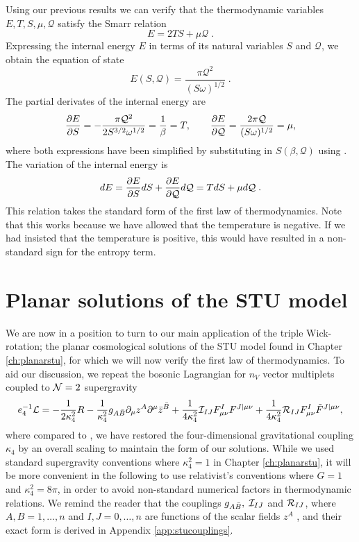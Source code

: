 Using our previous results we can verify that the thermodynamic variables $E,T,S,\mu, \mathcal{Q}$ satisfy the Smarr relation
\begin{equation}
E = 2TS + \mu \mathcal{Q}  \;.
\end{equation}
Expressing the internal energy $E$ in terms of its natural variables $S$ and $\mathcal{Q}$, we obtain the equation of state
\begin{equation*}
    E(S,\mathcal{Q}) = \frac{\pi \mathcal{Q}^2 }{(S \omega)^{1/2}} \;.
\end{equation*}
The partial derivates of the internal energy are 
\begin{equation*}
    \frac{\partial E}{\partial S} = - \frac{\pi \mathcal{Q}^2}{2 S^{3/2} \omega^{1/2}} = \frac{1}{\beta} = T, \qquad     \frac{\partial E}{\partial \mathcal{Q}} = \frac{2 \pi \mathcal{Q}}{(S \omega)^{1/2}} = \mu,
\end{equation*}
where both expressions have been simplified by substituting in $S(\beta, \mathcal{Q})$ using . The variation of the internal energy is
\begin{equation*}
    dE = \frac{\partial E}{\partial S} dS + \frac{\partial E}{\partial \mathcal{Q}} d\mathcal{Q}
       = T dS + \mu d\mathcal{Q} \;.
\end{equation*}
This relation takes the standard form of the first law of thermodynamics. Note that this works because we have allowed that the temperature is negative. If we had insisted that the temperature is positive, this would have resulted in a non-standard sign for the entropy term. 

\section{Planar solutions of the STU model}
\label{sec:thermostu}

We are now in a position to turn to our main application of the triple Wick-rotation; the planar cosmological solutions of the STU model found in Chapter \ref{ch:planarstu}, for which we will now verify the first law of thermodynamics. To aid our discussion, we repeat the bosonic Lagrangian for $n_V$ vector multiplets coupled to ${\cal N}=2$ supergravity
\begin{equation}
\label{Bos_Lag}
 e_4^{-1} {\cal L} = -\frac{1}{2 \kappa_4^2}R - \frac{1}{\kappa_4^2} g_{A\bar{B}} \partial_\mu z^A \partial^\mu \bar{z}^{\bar{B}} + \frac{1}{4 \kappa_4^2} {\cal I}_{IJ} F^I_{\mu \nu} F^{J|\mu \nu} + \frac{1}{4 \kappa_4^2} {\cal R}_{IJ} F^I_{\mu \nu} \tilde{F}^{J|\mu \nu},
\end{equation}
where compared to , we have restored the four-dimensional gravitational coupling $\kappa_4$ by an overall scaling to maintain the form of our solutions. While we used standard supergravity conventions where $\kappa_4^2 = 1$ in Chapter \ref{ch:planarstu}, it will be more convenient in the following to use relativist's conventions where $G=1$ and $\kappa_4^2 = 8\pi$, in order to avoid non-standard numerical factors in thermodynamic relations. We remind the reader that the couplings $g_{A\bar{B}}, \; {\cal I}_{IJ}$ and ${\cal R}_{IJ}$, where $A,B = 1, \ldots, n$ and $I,J = 0, \ldots, n$ are functions of the scalar fields $z^A$ , and their exact form is derived in Appendix \ref{app:stucouplings}. 

